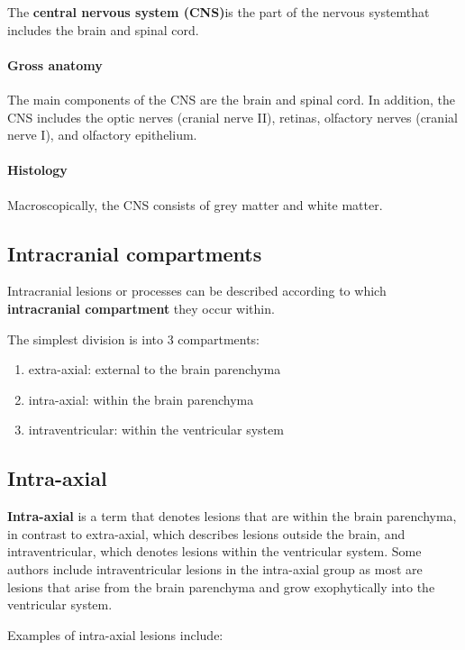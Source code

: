 The \textbf{central nervous system (CNS)}is the part of the nervous systemthat includes the brain and spinal cord.

\paragraph{Gross anatomy}

The main components of the CNS are the brain and spinal cord. In addition, the CNS includes the optic nerves (cranial nerve II), retinas, olfactory nerves (cranial nerve I), and olfactory epithelium.

\paragraph{Histology}

Macroscopically, the CNS consists of grey matter and white matter.

\subsection{Intracranial compartments}

Intracranial lesions or processes can be described according to which \textbf{intracranial compartment} they occur within.

The simplest division is into 3 compartments:

\begin{enumerate}
	\tightlist
	\item
	extra-axial: external to the brain parenchyma
	\item
	intra-axial: within the brain parenchyma
	\item
	intraventricular: within the ventricular system
\end{enumerate}

\subsection{Intra-axial}

\textbf{Intra-axial} is a term that denotes lesions that are within the brain parenchyma, in contrast to extra-axial, which describes lesions outside the brain, and intraventricular, which denotes lesions within the ventricular system. Some authors include intraventricular lesions in the intra-axial group as most are lesions that arise from the brain parenchyma and grow exophytically into the ventricular system.

Examples of intra-axial lesions include:

